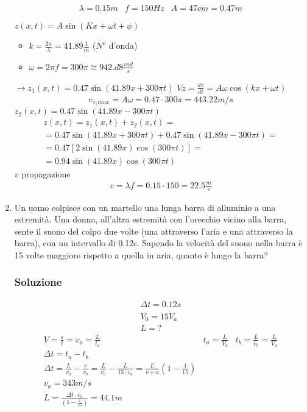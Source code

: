 \documentclass{report}
\begin{document}
\begin{enumerate}
\begin{eqnarray*}
  \lambda=0.15m & f=150Hz & A=47cm =0.47m
\end{eqnarray*}
\begin{tasks}
  \task $z(x,t)=A\sin(Kx+\omega t + \phi)$
  \begin{itemize}
  \item $k=\frac{2\pi}{\lambda}=41.89\frac{1}{m}$ ($N^o$ d'onda)
  \item $\omega=2\pi f=300\pi\cong 942.d8 \frac{rad}{s}$
  \end{itemize}
  $\to{} z_1(x,t)=0.47\sin(41.89x+300\pi t)$
  \task $Vz=\frac{dz}{dt}= A\omega \cos (kx+\omega t)$
  \begin{eqnarray*}
    v_{z_1max}=A\omega=0.47\cdot 300\pi = 443.22 m/s
  \end{eqnarray*}
  \task $z_2(x,t)=0.47\sin(41.89x-300\pi t)$
  \begin{eqnarray*}
    z(x,t)= z_1(x,t)+z_2(x,t)=\\
    =0.47\sin(41.89x+300\pi t)+0.47\sin(41.89x-300\pi t)=\\
    =0.47[2\sin (41.89x) \cos (300\pi t)]=\\
    =0.94\sin(41.89x)\cos(300\pi t)
  \end{eqnarray*}
  \task $v$ propagazione
  \begin{eqnarray*}
    v=\lambda f = 0.15\cdot 150=22.5\frac{m}{s}
  \end{eqnarray*}
\end{tasks}
\item Un uomo colpisce con un martello una lunga barra di alluminio a una
  estremità. Una donna, all'altra estremità con l'orecchio vicino alla barra,
  sente il suono del colpo due volte (una attraverso l'aria e una attraverso la
  barra), con un intervallo di 0.12s. Sapendo la velocità del suono nella barra è
  15 volte maggiore rispetto a quella in aria, quanto è lungo la barra?
  
\subsubsection{Soluzione}
\label{sec:sol14}

  \begin{eqnarray*}
    \Delta t= 0.12s\\
    V_0=15\dot V_a\\
    L=?
  \end{eqnarray*}
  \begin{eqnarray*}
    V=\frac{s}{t}=v_a=\frac{L}{t_a} & t_a=\frac{L}{V_a} & t_b=\frac{L}{v_b}
                                                          =\frac{L}{V_a}\\
    \Delta t=t_a-t_b\\
    \Delta t=\frac{L}{v_a}-\frac{v}{v_b}=\frac{L}{v_a}-\frac{L}{15\cdot v_a}=\frac{L}{v+a}\left(1-\frac{1}{15}\right)\\
    v_a=343m/s\\
    L=\frac{\Delta t\cdot v_a}{\left(1-\frac{1}{15}\right)}= 44.1m
  \end{eqnarray*}
\end{enumerate}
\end{document}
